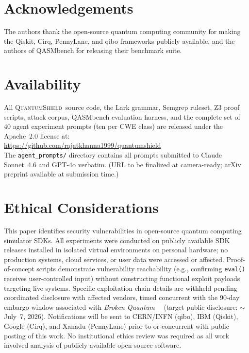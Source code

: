 \documentclass[conference,compsoc]{IEEEtran}
\newcommand{\tool}{\textsc{QuantumShield}}
\newcommand{\broken}{\textit{Broken Quantum}~\cite{blain2026broken}}
\begin{document}
\section*{Acknowledgements}
The authors thank the open-source quantum computing community for making
the Qiskit, Cirq, PennyLane, and qibo frameworks publicly available,
and the authors of QASMbench for releasing their benchmark suite.

\section*{Availability}
\noindent All \tool\ source code, the Lark grammar, Semgrep ruleset, Z3 proof
scripts, attack corpus, QASMbench evaluation harness, and the complete
set of 40 agent experiment prompts (ten per CWE class) are released
under the Apache~2.0 license at:\\
\url{https://github.com/rajatkhanna1999/quantumshield}\\
The \texttt{agent\_prompts/} directory contains all prompts submitted
to Claude Sonnet~4.6 and GPT-4o verbatim.
(URL to be finalized at camera-ready; arXiv preprint available at
submission time.)

\section*{Ethical Considerations}
\noindent This paper identifies security vulnerabilities in open-source quantum
computing simulator SDKs.
All experiments were conducted on publicly available SDK releases
installed in isolated virtual environments on personal hardware; no
production systems, cloud services, or user data were accessed or affected.
Proof-of-concept scripts demonstrate vulnerability reachability (e.g.,
confirming \texttt{eval()} receives user-controlled input) without
constructing functional exploit payloads targeting live systems.
Specific exploitation chain details are withheld pending coordinated
disclosure with affected vendors, timed concurrent with the 90-day
embargo window associated with \broken~\cite{blain2026broken}
(target public disclosure: $\sim$July~7, 2026).
Notifications will be sent to CERN/INFN (qibo), IBM (Qiskit),
Google (Cirq), and Xanadu (PennyLane) prior to or concurrent with
public posting of this work.
No institutional ethics review was required as all work involved
analysis of publicly available open-source software.
\end{document}

